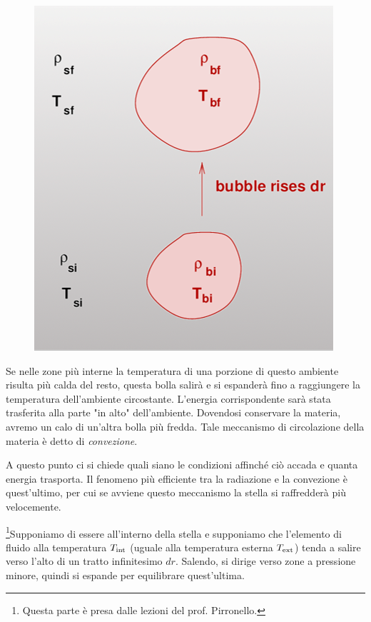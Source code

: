 \begin{minipage}{0.365\textwidth}
    \begin{figure}[H]
        \centering
        \includegraphics[scale=0.5]{bolla.png}
        \label{bolla}
    \end{figure}
\end{minipage}
\begin{minipage}{0.63\textwidth}
    \vspace{0.6cm}Se nelle zone più interne la temperatura di una porzione di questo ambiente risulta più calda del resto, questa bolla salirà e si espanderà fino a raggiungere la temperatura dell'ambiente circostante. L'energia corrispondente sarà stata trasferita alla parte "in alto" dell'ambiente. Dovendosi conservare la materia, avremo un calo di un'altra bolla più fredda. Tale meccanismo di circolazione della materia è detto di \textit{convezione}.

    A questo punto ci si chiede quali siano le condizioni affinché ciò accada e quanta energia trasporta. Il fenomeno più efficiente tra la radiazione e la convezione è quest'ultimo, per cui se avviene questo meccanismo la stella si raffredderà più velocemente.
\end{minipage}

\vspace{0.2cm}\footnote{Questa parte è presa dalle lezioni del prof. Pirronello.}Supponiamo di essere all'interno della stella e supponiamo che l'elemento di fluido alla temperatura $T_{\rm int}$ (uguale alla temperatura esterna $T_{\rm ext}$) tenda a salire verso l'alto di un tratto infinitesimo $dr$. Salendo, si dirige verso zone a pressione minore, quindi si espande per equilibrare quest'ultima.

